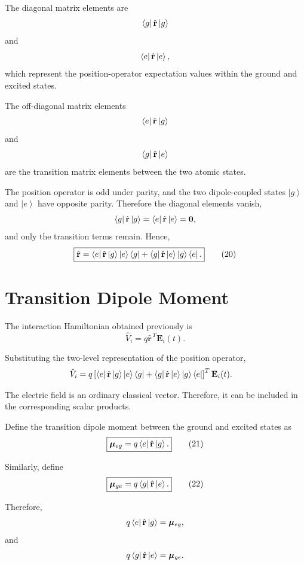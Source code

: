 \documentclass[12pt,a4paper]{article}
\newcommand{\ketg}{\left|g\right\rangle}
\newcommand{\kete}{\left|e\right\rangle}
\begin{document}
The diagonal matrix elements are
\[
\bra g\hat{\mathbf r}\ketg
\]
and
\[
\bra e\hat{\mathbf r}\kete,
\]
which represent the position-operator expectation values within
the ground and excited states.

The off-diagonal matrix elements
\[
\bra e\hat{\mathbf r}\ketg
\]
and
\[
\bra g\hat{\mathbf r}\kete
\]
are the transition matrix elements between the two atomic states.

The position operator is odd under parity, and the two dipole-coupled states
\(\ketg\) and \(\kete\) have opposite parity. Therefore the diagonal elements
vanish,
\[
\bra g\hat{\mathbf r}\ketg=\bra e\hat{\mathbf r}\kete=\mathbf 0,
\]
and only the transition terms remain. Hence,
\begin{equation}
\boxed{
\hat{\mathbf r}
=
\bra e\hat{\mathbf r}\ketg
\kete\bra g
+
\bra g\hat{\mathbf r}\kete
\ketg\bra e.
}
\tag{20}
\end{equation}


\section{Transition Dipole Moment}

The interaction Hamiltonian obtained previously is
\[
\hat V_i
=
q\hat{\mathbf r}^{\,T}\mathbf E_i(t).
\]

Substituting the two-level representation of the position operator,
\[
\begin{aligned}
\hat V_i
&=
q
\left[
\bra e\hat{\mathbf r}\ketg
\kete\bra g
+
\bra g\hat{\mathbf r}\kete
\ketg\bra e
\right]^{T}
\mathbf E_i(t).
\end{aligned}
\]

The electric field is an ordinary classical vector. Therefore, it
can be included in the corresponding scalar products.

Define the transition dipole moment between the ground and excited
states as
\begin{equation}
\boxed{
\boldsymbol{\mu}_{eg}
=
q\bra e\hat{\mathbf r}\ketg.
}
\tag{21}
\end{equation}

Similarly, define
\begin{equation}
\boxed{
\boldsymbol{\mu}_{ge}
=
q\bra g\hat{\mathbf r}\kete.
}
\tag{22}
\end{equation}

Therefore,
\[
q
\bra e\hat{\mathbf r}\ketg
=
\boldsymbol{\mu}_{eg},
\]
and
\[
q
\bra g\hat{\mathbf r}\kete
=
\boldsymbol{\mu}_{ge}.
\]
\end{document}
